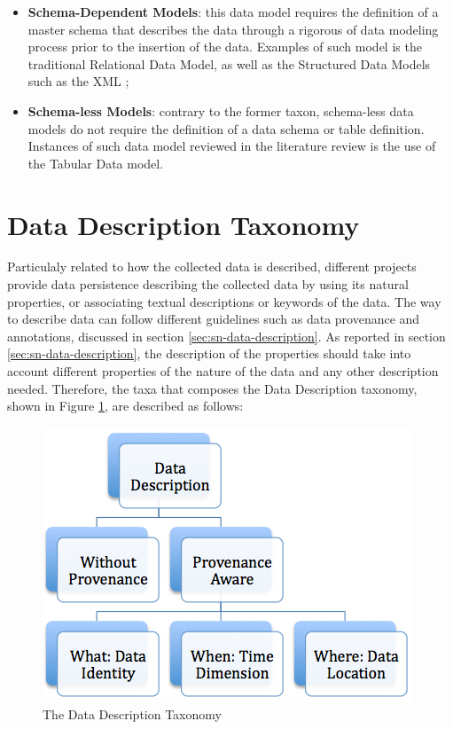 \begin{itemize}
  \item \textbf{Schema-Dependent Models}: this data model requires the
  definition of a master schema that describes the data through a rigorous of 
  data modeling process prior to the insertion of the data. Examples of such
  model is the traditional Relational Data Model\cite{relational-model}, as
 well as the Structured Data Models such as the XML \cite{xml};
  \item \textbf{Schema-less Models}: contrary to the former taxon, schema-less
  data models do not require the definition of a data schema or table
  definition. Instances of such data model reviewed in the literature review
  is the use of the Tabular Data model.
\end{itemize}

\section{Data Description Taxonomy}

Particulaly related to how the collected data is described, different projects
provide data persistence describing the collected data by using its natural
properties, or associating textual descriptions or keywords of the data. The
way to describe data can follow different guidelines such as data provenance
and annotations, discussed in section \ref{sec:sn-data-description}. As
reported in section \ref{sec:sn-data-description}, the description of the
properties should take into account different properties of the nature of the
data and any other description needed. Therefore, the taxa that composes the
Data Description taxonomy, shown in Figure
\ref{fig:taxonomy-data-description}, are described as follows:

\begin{figure}[h]
  \centering
  \includegraphics[scale=0.5]{../diagrams/taxonomy-data-description}
  \caption{The Data Description Taxonomy}
  \label{fig:taxonomy-data-description}
\end{figure}

